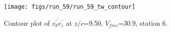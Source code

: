 \begin{figure}[H]
\centering
\texttt{[image: figs/run\_59/run\_59\_tw\_contour]}
\caption{Contour plot of $\overline{v_{\theta}^{\prime} v_{z}^{\prime}}$ at $z/c$=9.50, $V_{free}$=30.9, station 6.}
\label{fig:run_59_tw_contour}
\end{figure}


